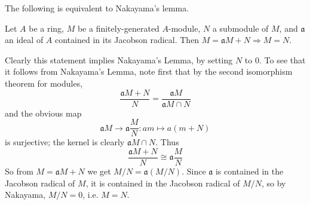 \documentclass[12pt]{article}
\newcommand{\sma}{\mathfrak{a}}
\begin{document}
The following is equivalent to Nakayama's lemma.

Let $A$ be a ring, $M$ be a finitely-generated $A$-module, $N$ a submodule of $M$, and $\sma$ an ideal of $A$ contained in its Jacobson radical. Then $M = \sma M + N \Rightarrow M=N$.

Clearly this statement implies Nakayama's Lemma, by setting $N$ to $0$. To see that it follows from Nakayama's Lemma, note first that by the second isomorphism theorem for modules,
\[
  \frac{\sma M+N}{N} = \frac{\sma M}{\sma M\cap N}
\]
and the obvious map
\[
  \sma M\to \sma\frac{M}{N} : am\mapsto a(m+N)
\]
is surjective; the kernel is clearly $\sma M\cap N$. Thus
\[
  \frac{\sma M+N}{N} \cong \sma\frac{M}{N}
\]
So from $M=\sma M+N$ we get $M/N = \sma(M/N)$. Since $\sma$ is contained in the Jacobson radical of $M$, it is contained in the Jacobson radical of $M/N$, so by Nakayama, $M/N=0$, i.e. $M=N$.


\end{document}
